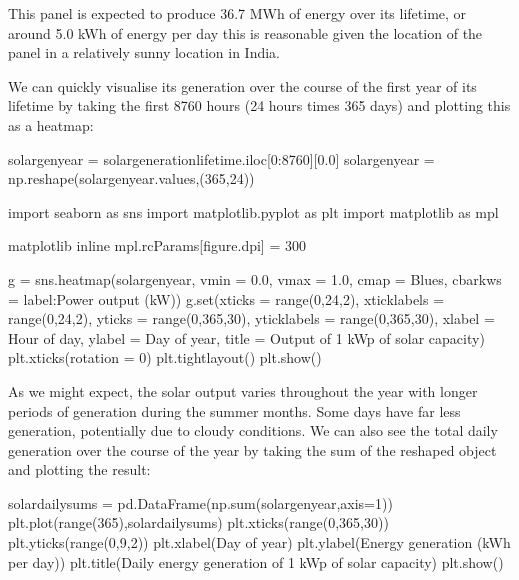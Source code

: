 \documentclass[letterpaper,10pt,english]{sphinxmanual}
\begin{document}
\sphinxAtStartPar
This panel is expected to produce 36.7 MWh of energy over its lifetime,
or around 5.0 kWh of energy per day \sphinxhyphen{} this is reasonable given the
location of the panel in a relatively sunny location in India.

\sphinxAtStartPar
We can quickly visualise its generation over the course of the first
year of its lifetime by taking the first 8760 hours (24 hours times 365
days) and plotting this as a heatmap:

\begin{sphinxVerbatim}[commandchars=\\\{\}]
solar\PYGZus{}gen\PYGZus{}year = solar\PYGZus{}generation\PYGZus{}lifetime.iloc[0:8760][\PYGZsq{}0.0\PYGZsq{}]
solar\PYGZus{}gen\PYGZus{}year = np.reshape(solar\PYGZus{}gen\PYGZus{}year.values,(365,24))

import seaborn as sns
import matplotlib.pyplot as plt
import matplotlib as mpl

\PYGZpc{}matplotlib inline
mpl.rcParams[\PYGZsq{}figure.dpi\PYGZsq{}] = 300

g = sns.heatmap(solar\PYGZus{}gen\PYGZus{}year,
                       vmin = 0.0, vmax = 1.0,
                       cmap = \PYGZsq{}Blues\PYGZsq{}, cbar\PYGZus{}kws = \PYGZob{}\PYGZsq{}label\PYGZsq{}:\PYGZsq{}Power output (kW)\PYGZsq{}\PYGZcb{})
g.set(xticks = range(0,24,2), xticklabels = range(0,24,2),
      yticks = range(0,365,30), yticklabels = range(0,365,30),
      xlabel = \PYGZsq{}Hour of day\PYGZsq{}, ylabel = \PYGZsq{}Day of year\PYGZsq{},
      title = \PYGZsq{}Output of 1 kWp of solar capacity\PYGZsq{})
plt.xticks(rotation = 0)
plt.tight\PYGZus{}layout()
plt.show()
\end{sphinxVerbatim}

\noindent{}

\sphinxAtStartPar
As we might expect, the solar output varies throughout the year with
longer periods of generation during the summer months. Some days have
far less generation, potentially due to cloudy conditions. We can also
see the total daily generation over the course of the year by taking the
sum of the reshaped  object and plotting the result:

\begin{sphinxVerbatim}[commandchars=\\\{\}]
solar\PYGZus{}daily\PYGZus{}sums = pd.DataFrame(np.sum(solar\PYGZus{}gen\PYGZus{}year,axis=1))
plt.plot(range(365),solar\PYGZus{}daily\PYGZus{}sums)
plt.xticks(range(0,365,30))
plt.yticks(range(0,9,2))
plt.xlabel(\PYGZsq{}Day of year\PYGZsq{})
plt.ylabel(\PYGZsq{}Energy generation (kWh per day)\PYGZsq{})
plt.title(\PYGZsq{}Daily energy generation of 1 kWp of solar capacity\PYGZsq{})
plt.show()
\end{sphinxVerbatim}
\end{document}
